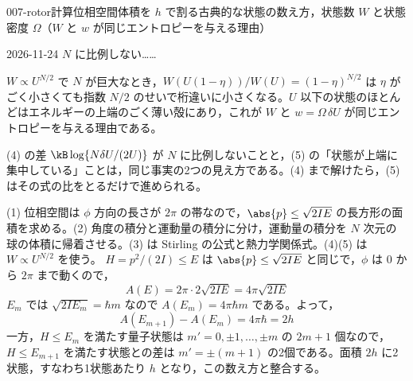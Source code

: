 \documentclass[uplatex,dvipdfmx,a4paper,11pt]{jsarticle}
\begin{document}
\begin{mondai}{007-rotor}{計算}{位相空間体積を $h$ で割る古典的な状態の数え方，状態数 $W$ と状態密度 $\Omega$（$W$ と $w$ が同じエントロピーを与える理由）}
\begin{kotaeutsushi}{2026-11-24}
$N$ に比例しない……
\mikai
{}
\end{kotaeutsushi}
\begin{kizuki}
\item $W\propto U^{N/2}$ で $N$ が巨大なとき，$W(U(1-\eta))/W(U)=(1-\eta)^{N/2}$ は $\eta$ がごく小さくても指数 $N/2$ のせいで桁違いに小さくなる。$U$ 以下の状態のほとんどはエネルギーの上端のごく薄い殻にあり，これが $W$ と $w=\Omega\,\delta U$ が同じエントロピーを与える理由である。
\item (4) の差 $\kB\log\{N\delta U/(2U)\}$ が $N$ に比例しないことと，(5) の「状態が上端に集中している」ことは，同じ事実の2つの見え方である。(4) まで解けたら，(5) はその式の比をとるだけで進められる。
\end{kizuki}
\begin{tadashii}
\houshin (1) 位相空間は $\phi$ 方向の長さが $2\pi$ の帯なので，$\abs{p}\le\sqrt{2IE}$ の長方形の面積を求める。(2) 角度の積分と運動量の積分に分け，運動量の積分を $N$ 次元の球の体積に帰着させる。(3) は Stirling の公式と熱力学関係式。(4)(5) は $W\propto U^{N/2}$ を使う。
\keisan
{} $H=p^{2}/(2I)\le E$ は $\abs{p}\le\sqrt{2IE}$ と同じで，$\phi$ は $0$ から $2\pi$ まで動くので，
\[A(E)=2\pi\cdot2\sqrt{2IE}=4\pi\sqrt{2IE}\]
$E_{m}$ では $\sqrt{2IE_{m}}=\hbar m$ なので $A(E_{m})=4\pi\hbar m$ である。よって，
\[A(E_{m+1})-A(E_{m})=4\pi\hbar=2h\]
一方，$H\le E_{m}$ を満たす量子状態は $m'=0,\pm1,\dots,\pm m$ の $2m+1$ 個なので，$H\le E_{m+1}$ を満たす状態との差は $m'=\pm(m+1)$ の2個である。面積 $2h$ に2状態，すなわち1状態あたり $h$ となり，この数え方と整合する。


\end{tadashii}
\end{mondai}
\end{document}
